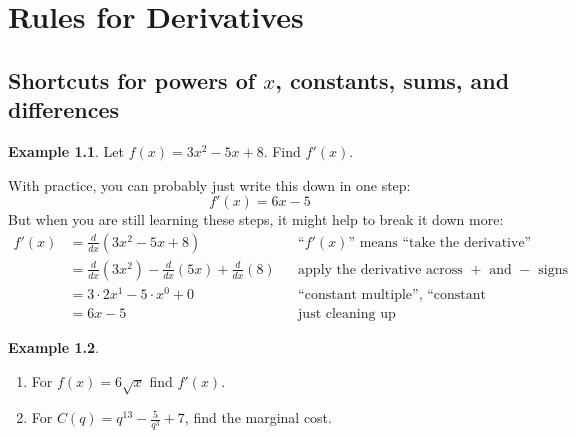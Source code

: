 \documentclass[oneside]{book}
\newcommand{\deriv}[2]{\frac{d#1}{d#2}}
\newcommand{\ddx}{\deriv {}x}
\theoremstyle{definition}
\newtheorem{example}{Example}
\theoremstyle{solution}
\newtheorem*{solution}{Solution}
\newenvironment{solution}{\vspace{2in}\comment}{\endcomment}
\begin{document}
\chapter{Rules for Derivatives}
\section[Derivatives of power functions]{Shortcuts for powers of $x$,
  constants, sums, and differences}

\begin{example}
Let $f(x)=3x^2-5x+8$.  Find $f'(x)$.  
\end{example}

\begin{solution}
With practice, you can probably just write this down in one step:
$$
f'(x) = 6x -5
$$
But when you are still learning these steps, it might help to break it
down more:
\begin{align*}
f'(x) & = \ddx (3x^2-5x+8) &&\text{``$f'(x)$'' means ``take the derivative''}\\
    &  = \ddx (3x^2) - \ddx(5x) + \ddx(8) && \text{apply the derivative across $+$ and $-$ signs}\\
    &  = 3\cdot 2x^1 - 5\cdot x^0 + 0  && \text{``constant multiple'', ``constant rule'' and ``power rule''}\\
    &  = 6 x  - 5  && \text{just cleaning up}
\end{align*}
\end{solution}

\begin{example}
\begin{enumerate}
\item For $f(x)=6\sqrt{x}$ find $f'(x)$.
\item For $C(q) = q^{13}-\frac{5}{q^3}+7$, find the marginal cost.
\end{enumerate}
\end{example}
\end{document}
